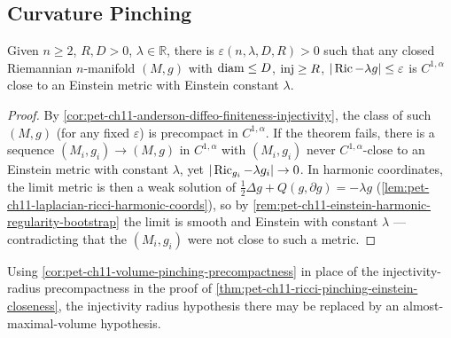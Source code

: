 \subsection{Curvature Pinching}

\begin{theorem}
  \label{thm:pet-ch11-ricci-pinching-einstein-closeness}
  Given $n\ge2$, $R,D>0$, $\lambda\in\mathbb{R}$, there is
  $\varepsilon(n,\lambda,D,R)>0$ such that any closed Riemannian $n$-manifold
  $(M,g)$ with $\operatorname{diam}\le D$, $\operatorname{inj}\ge R$, $|\operatorname{Ric}-\lambda g|\le\varepsilon$ is
  $C^{1,\alpha}$ close to an Einstein metric with Einstein constant $\lambda$.
\end{theorem}
\begin{proof}
  By \cref{cor:pet-ch11-anderson-diffeo-finiteness-injectivity}, the class of
  such $(M,g)$ (for any fixed $\varepsilon$) is precompact in $C^{1,\alpha}$.
  If the theorem fails, there is a sequence $(M_i,g_i)\to(M,g)$ in
  $C^{1,\alpha}$ with $(M_i,g_i)$ never $C^{1,\alpha}$-close to an Einstein
  metric with constant $\lambda$, yet $|\operatorname{Ric}_{g_i}-\lambda g_i|\to0$. In
  harmonic coordinates, the limit metric is then a weak solution of
  $\tfrac12\Delta g+Q(g,\partial g)=-\lambda g$
  (\cref{lem:pet-ch11-laplacian-ricci-harmonic-coords}), so by
  \cref{rem:pet-ch11-einstein-harmonic-regularity-bootstrap} the limit is
  smooth and Einstein with constant $\lambda$ — contradicting that the
  $(M_i,g_i)$ were not close to such a metric.
\end{proof}

\begin{remark}
  \label{rem:pet-ch11-ricci-pinching-volume-alternative}
  Using \cref{cor:pet-ch11-volume-pinching-precompactness} in place of the
  injectivity-radius precompactness in the proof of
  \cref{thm:pet-ch11-ricci-pinching-einstein-closeness}, the injectivity
  radius hypothesis there may be replaced by an almost-maximal-volume
  hypothesis.
\end{remark}

